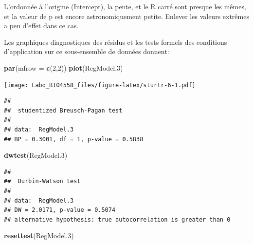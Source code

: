 \documentclass[12pt,]{book}
\newenvironment{Shaded}{\begin{snugshade}}{\end{snugshade}}
\newcommand{\DataTypeTok}[1]{\textcolor[rgb]{0.13,0.29,0.53}{#1}}
\newcommand{\DecValTok}[1]{\textcolor[rgb]{0.00,0.00,0.81}{#1}}
\newcommand{\FloatTok}[1]{\textcolor[rgb]{0.00,0.00,0.81}{#1}}
\newcommand{\KeywordTok}[1]{\textcolor[rgb]{0.13,0.29,0.53}{\textbf{#1}}}
\newcommand{\NormalTok}[1]{#1}
\newcommand{\OperatorTok}[1]{\textcolor[rgb]{0.81,0.36,0.00}{\textbf{#1}}}
\newcommand{\StringTok}[1]{\textcolor[rgb]{0.31,0.60,0.02}{#1}}
\begin{document}
L'ordonnée à l'origine (Intercept), la pente, et le R carré sont presque les mêmes, et la valeur de p est encore astronomiquement petite. Enlever les valeurs extrêmes a peu d'effet dans ce cas.

Les graphiques diagnostiques des résidus et les tests formels des conditions d'application sur ce sous-ensemble de données donnent:

\begin{Shaded}
\begin{Highlighting}[]
\KeywordTok{par}\NormalTok{(}\DataTypeTok{mfrow =} \KeywordTok{c}\NormalTok{(}\DecValTok{2}\NormalTok{,}\DecValTok{2}\NormalTok{))}
\KeywordTok{plot}\NormalTok{(RegModel}\FloatTok{.3}\NormalTok{)}
\end{Highlighting}
\end{Shaded}

\texttt{[image: Labo\_BIO4558\_files/figure-latex/sturtr-6-1.pdf]}

\begin{Shaded}
\end{Shaded}

\begin{verbatim}
## 
##  studentized Breusch-Pagan test
## 
## data:  RegModel.3
## BP = 0.3001, df = 1, p-value = 0.5838
\end{verbatim}

\begin{Shaded}
\begin{Highlighting}[]
\KeywordTok{dwtest}\NormalTok{(RegModel}\FloatTok{.3}\NormalTok{)}
\end{Highlighting}
\end{Shaded}

\begin{verbatim}
## 
##  Durbin-Watson test
## 
## data:  RegModel.3
## DW = 2.0171, p-value = 0.5074
## alternative hypothesis: true autocorrelation is greater than 0
\end{verbatim}

\begin{Shaded}
\begin{Highlighting}[]
\KeywordTok{resettest}\NormalTok{(RegModel}\FloatTok{.3}\NormalTok{)}
\end{Highlighting}
\end{Shaded}
\end{document}
